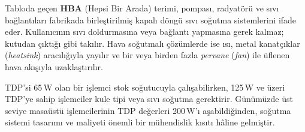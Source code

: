 Tabloda geçen \textbf{HBA} (Hepsi Bir Arada) terimi, pompası, radyatörü ve sıvı bağlantıları fabrikada birleştirilmiş kapalı döngü sıvı soğutma sistemlerini ifade eder. Kullanıcının sıvı doldurmasına veya bağlantı yapmasına gerek kalmaz; kutudan çıktığı gibi takılır. Hava soğutmalı çözümlerde ise ısı, metal kanatçıklar (\emph{heatsink}) aracılığıyla yayılır ve bir veya birden fazla \emph{pervane} (\emph{fan}) ile üflenen hava akışıyla uzaklaştırılır.

TDP'si 65\,W olan bir işlemci stok soğutucuyla çalışabilirken, 125\,W ve üzeri TDP'ye sahip işlemciler kule tipi veya sıvı soğutma gerektirir. Günümüzde üst seviye masaüstü işlemcilerinin TDP değerleri 200\,W'ı aşabildiğinden, soğutma sistemi tasarımı ve maliyeti önemli bir mühendislik kısıtı hâline gelmiştir.


